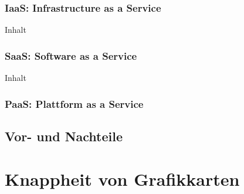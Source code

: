 \documentclass[12pt,toc=bib,toc=listof]{scrreprt}
\begin{document}

\subsection{IaaS: Infrastructure as a Service}
\label{sec:IaaS: Infrastructure as a Service}

Inhalt

\subsection{SaaS: Software as a Service}
\label{sec:SaaS: Software as a Service}

Inhalt

\subsection{PaaS: Plattform as a Service}
\label{sec:PaaS: Plattform as a Service}


\section{Vor- und Nachteile}
\label{Vor- und Nachteile}


\chapter{Knappheit von Grafikkarten} %
\label{sec:Knappheit von Grafikkarten}
\end{document}
